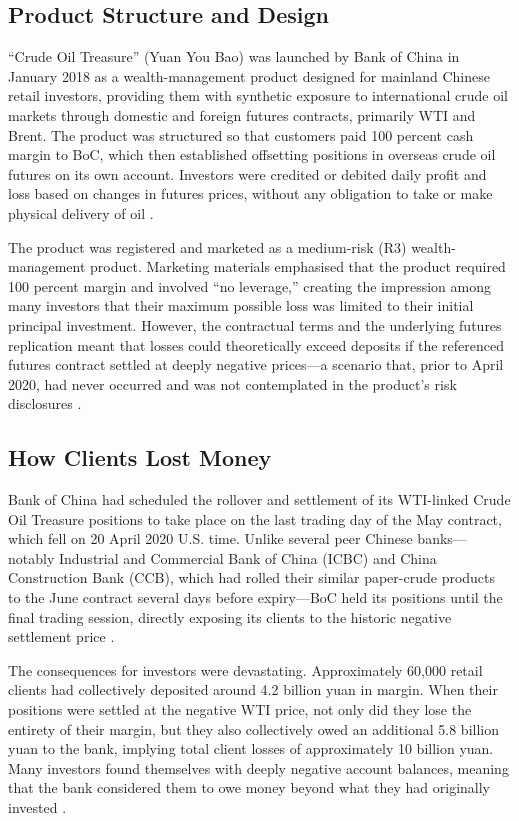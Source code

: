 \documentclass[a4paper,11pt]{article}
\begin{document}
\subsection{Product Structure and Design}

``Crude Oil Treasure'' (Yuan You Bao) was launched by Bank of China
in January 2018 as a wealth-management product designed for mainland
Chinese retail investors, providing them with synthetic exposure to
international crude oil markets through domestic and foreign futures
contracts, primarily WTI and Brent. The product was structured so
that customers paid 100 percent cash margin to BoC, which then
established offsetting positions in overseas crude oil futures on its
own account. Investors were credited or debited daily profit and loss
based on changes in futures prices, without any obligation to take or
make physical delivery of oil \cite{drpress2023icbc}.

The product was registered and marketed as a medium-risk (R3)
wealth-management product. Marketing materials emphasised that the
product required 100 percent margin and involved ``no leverage,''
creating the impression among many investors that their maximum
possible loss was limited to their initial principal investment.
However, the contractual terms and the underlying futures replication
meant that losses could theoretically exceed deposits if the
referenced futures contract settled at deeply negative prices---a
scenario that, prior to April 2020, had never occurred and was not
contemplated in the product's risk disclosures \cite{drpress2023icbc}.

\subsection{How Clients Lost Money}

Bank of China had scheduled the rollover and settlement of its
WTI-linked Crude Oil Treasure positions to take place on the last
trading day of the May contract, which fell on 20 April 2020 U.S.
time. Unlike several peer Chinese banks---notably Industrial and
Commercial Bank of China (ICBC) and China Construction Bank (CCB),
which had rolled their similar paper-crude products to the June
contract several days before expiry---BoC held its positions until
the final trading session, directly exposing its clients to the
historic negative settlement price \cite{atlantis2022casestudy}.

The consequences for investors were devastating. Approximately 60,000
retail clients had collectively deposited around 4.2 billion yuan in
margin. When their positions were settled at the negative WTI price,
not only did they lose the entirety of their margin, but they also
collectively owed an additional 5.8 billion yuan to the bank,
implying total client losses of approximately 10 billion yuan. Many
investors found themselves with deeply negative account balances,
meaning that the bank considered them to owe money beyond what they
had originally invested \cite{argus2020fined}.
\end{document}
